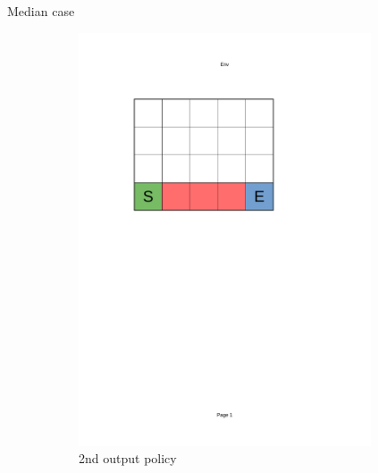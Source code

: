 \documentclass[10pt]{beamer}
\begin{document}
\begin{frame}{Median case}
\begin{figure}[!ht]
\begin{subfigure}{0.24\textwidth}
                \includegraphics[page=8, trim = 40mm 40mm 70mm 165mm, clip, width=0.95\textwidth]{figures/personal_work/policies.pdf}
            \caption{2nd output policy}
        \end{subfigure}
            \centering
        \begin{subfigure}{0.24\textwidth}
            \centering

\end{subfigure}
\end{figure}
\end{frame}
\end{document}
